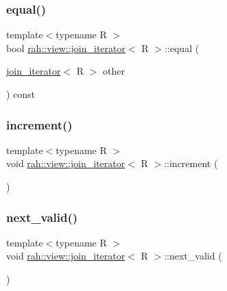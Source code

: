 \mbox{\label{structrah_1_1view_1_1join__iterator_a76c4e51e7c191e189e01d15eff2b7055}} 
\subsubsection{\texorpdfstring{equal()}{equal()}}
{\footnotesize\ttfamily template$<$typename R $>$ \\
bool \mbox{\hyperlink{structrah_1_1view_1_1join__iterator}{rah\+::view\+::join\+\_\+iterator}}$<$ R $>$\+::equal (\begin{DoxyParamCaption}\item[{\mbox{\hyperlink{structrah_1_1view_1_1join__iterator}{join\+\_\+iterator}}$<$ R $>$}]{other }\end{DoxyParamCaption}) const\hspace{0.3cm}{\ttfamily [inline]}}

\mbox{\label{structrah_1_1view_1_1join__iterator_a4f81464b6ff2707bb21d2bbd409c4f4d}} 
\subsubsection{\texorpdfstring{increment()}{increment()}}
{\footnotesize\ttfamily template$<$typename R $>$ \\
void \mbox{\hyperlink{structrah_1_1view_1_1join__iterator}{rah\+::view\+::join\+\_\+iterator}}$<$ R $>$\+::increment (\begin{DoxyParamCaption}{ }\end{DoxyParamCaption})\hspace{0.3cm}{\ttfamily [inline]}}

\mbox{\label{structrah_1_1view_1_1join__iterator_a6b3ef13305f87d011e2fecdb28b5dec6}} 
\subsubsection{\texorpdfstring{next\_valid()}{next\_valid()}}
{\footnotesize\ttfamily template$<$typename R $>$ \\
void \mbox{\hyperlink{structrah_1_1view_1_1join__iterator}{rah\+::view\+::join\+\_\+iterator}}$<$ R $>$\+::next\+\_\+valid (\begin{DoxyParamCaption}{ }\end{DoxyParamCaption})\hspace{0.3cm}{\ttfamily [inline]}}



